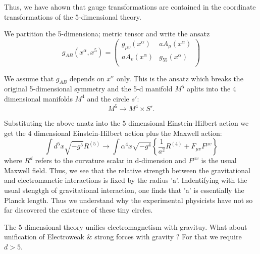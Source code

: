 Thus, we have ahown that gauge transformations are contained in the coordinate transformations of the 5-dimensional theory. 

We partition the 5-dimensiona; metric tensor and write the ansatz
\begin{equation*}
g_{AB} (x^{\alpha}, x^{5}) = \left(
\begin{array}{c|c}
g_{\mu v} (x^{\alpha}) & a A_{\mu} (x^{\alpha})\\[0.2cm]
\hline
a A_{v}(x^{\alpha}) & g_{55} (x^{\alpha})\\[0.2cm]
\end{array}
\right)
\end{equation*}

We assume that $g_{AB}$ depends on $x^{\alpha}$ only. This is the ansatz which breaks the original 5-dimensional symmetry and the 5-d manifold $M^{5}$ aplits into the 4 dimensional manifolds $M^{4}$ and the circle $s'$:
$$
M^{5} \rightarrow M^{4} \times S'.
$$

Substituting the above anatz into the 5 dimensional Einstein-Hilbert action we get the 4 dimensional Einstein-Hilbert action plus the Maxwell action:
$$
\int d^{5}x \sqrt{-g^{5}} R^{(5)} \rightarrow \int \alpha^{4} x \sqrt{-g^{4}} \left\{\frac{1}{a^{2}} R^{(4)} + F_{\mu v}F^{\mu v} \right\}
$$
where $R^{d}$ refers to the curvature scalar in d-dimension and $F^{\mu v}$ is the usual Maxwell field. Thus, we see that the relative strength between the gravitational and  electromanetic interactions is fixed by the radius 'a'. Indentifying with the usual stengtgh of gravitational interaction, one finds that 'a' is essentially the Planck length. Thus we understand why the experimental physicists have not so far discovered the existence of these tiny circles.

The 5 dimensional theory unifies electromagnetism with gravituy. What about unification of Electroweak \& strong forces with gravity ? For that we require $d > 5$.

